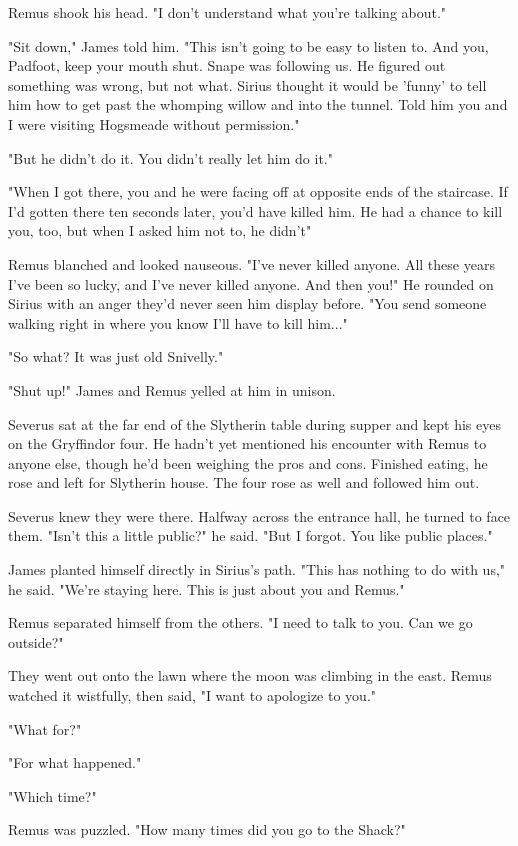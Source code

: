 \documentclass[a4paper,11pt]{article}
\begin{document}
Remus shook his head. "I don't understand what you're talking about."

"Sit down," James told him. "This isn't going to be easy to listen to. And you, Padfoot, keep your mouth shut. Snape was following us. He figured out something was wrong, but not what. Sirius thought it would be 'funny' to tell him how to get past the whomping willow and into the tunnel. Told him you and I were visiting Hogsmeade without permission."

"But he didn't do it. You didn't really let him do it."

"When I got there, you and he were facing off at opposite ends of the staircase. If I'd gotten there ten seconds later, you'd have killed him. He had a chance to kill you, too, but when I asked him not to, he didn't"

Remus blanched and looked nauseous. "I've never killed anyone. All these years I've been so lucky, and I've never killed anyone. And then you!" He rounded on Sirius with an anger they'd never seen him display before. "You send someone walking right in where you know I'll have to kill him..."

"So what? It was just old Snivelly."

"Shut up!" James and Remus yelled at him in unison.

Severus sat at the far end of the Slytherin table during supper and kept his eyes on the Gryffindor four. He hadn't yet mentioned his encounter with Remus to anyone else, though he'd been weighing the pros and cons. Finished eating, he rose and left for Slytherin house. The four rose as well and followed him out.

Severus knew they were there. Halfway across the entrance hall, he turned to face them. "Isn't this a little public?" he said. "But I forgot. You like public places."

James planted himself directly in Sirius's path. "This has nothing to do with us," he said. "We're staying here. This is just about you and Remus."

Remus separated himself from the others. "I need to talk to you. Can we go outside?"

They went out onto the lawn where the moon was climbing in the east. Remus watched it wistfully, then said, "I want to apologize to you."

"What for?"

"For what happened."

"Which time?"

Remus was puzzled. "How many times did you go to the Shack?"
\end{document}
